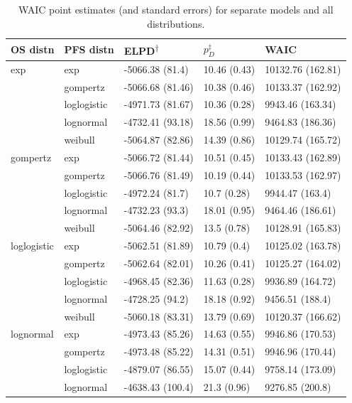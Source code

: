\documentclass[AMA,STIX1COL]{WileyNJD-v2}
\begin{document}
\begin{table}[!ht]
\centering
\caption{WAIC point estimates (and standard errors) for separate models and all distributions. \label{tab:waic_sep}}
\begin{tabular}{l|l|l|l|l}
\hline
\textbf{OS distn} & \textbf{PFS distn} & \textbf{ELPD\textsuperscript{$\dagger$}} & \textbf{$p_D^{\ddagger}$} & \textbf{WAIC} \\
\hline
exp & exp & -5066.38 (81.4) & 10.46 (0.43) & 10132.76 (162.81)\\
\hline
 & gompertz & -5066.68 (81.46) & 10.38 (0.46) & 10133.37 (162.92)\\
\hline
 & loglogistic & -4971.73 (81.67) & 10.36 (0.28) & 9943.46 (163.34)\\
\hline
 & lognormal & -4732.41 (93.18) & 18.56 (0.99) & 9464.83 (186.36)\\
\hline
 & weibull & -5064.87 (82.86) & 14.39 (0.86) & 10129.74 (165.72)\\
\hline
gompertz & exp & -5066.72 (81.44) & 10.51 (0.45) & 10133.43 (162.89)\\
\hline
 & gompertz & -5066.76 (81.49) & 10.19 (0.44) & 10133.53 (162.97)\\
\hline
 & loglogistic & -4972.24 (81.7) & 10.7 (0.28) & 9944.47 (163.4)\\
\hline
 & lognormal & -4732.23 (93.3) & 18.01 (0.95) & 9464.46 (186.61)\\
\hline
 & weibull & -5064.46 (82.92) & 13.5 (0.78) & 10128.91 (165.83)\\
\hline
loglogistic & exp & -5062.51 (81.89) & 10.79 (0.4) & 10125.02 (163.78)\\
\hline
 & gompertz & -5062.64 (82.01) & 10.26 (0.41) & 10125.27 (164.02)\\
\hline
 & loglogistic & -4968.45 (82.36) & 11.63 (0.28) & 9936.89 (164.72)\\
\hline
 & lognormal & -4728.25 (94.2) & 18.18 (0.92) & 9456.51 (188.4)\\
\hline
 & weibull & -5060.18 (83.31) & 13.79 (0.69) & 10120.37 (166.62)\\
\hline
lognormal & exp & -4973.43 (85.26) & 14.63 (0.55) & 9946.86 (170.53)\\
\hline
 & gompertz & -4973.48 (85.22) & 14.31 (0.51) & 9946.96 (170.44)\\
\hline
 & loglogistic & -4879.07 (86.55) & 15.07 (0.44) & 9758.14 (173.09)\\
\hline
 & lognormal & -4638.43 (100.4) & 21.3 (0.96) & 9276.85 (200.8)\\

\end{tabular}
\end{table}
\end{document}
